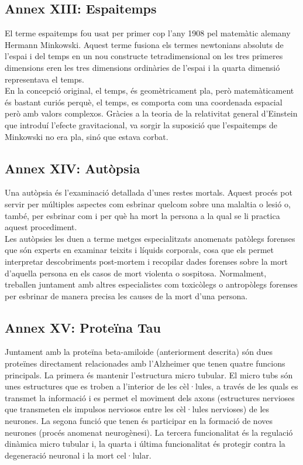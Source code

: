 \documentclass[a4paper,12pt]{article}
\begin{document}
\subsection*{Annex XIII: Espaitemps}
El terme espaitemps fou usat per primer cop l'any 1908 pel matemàtic alemany Hermann Minkowski. Aquest terme fusiona els termes newtonians absoluts de l'espai i del temps en un nou constructe tetradimensional on les tres primeres dimensions eren les tres dimensions ordinàries de l'espai i la quarta dimensió representava el temps.\\
En la concepció original, el temps, és geomètricament pla, però matemàticament és bastant curiós perquè, el temps, es comporta com una coordenada espacial però amb valors complexos. Gràcies a la teoria de la relativitat general d'Einstein que introduí l'efecte gravitacional, va sorgir la suposició que l'espaitemps de Minkowski no era pla, sinó que estava corbat.
\subsection*{Annex XIV: Autòpsia}
Una autòpsia és l'examinació detallada d'unes restes mortals. Aquest procés pot servir per múltiples aspectes com esbrinar quelcom sobre una malaltia o lesió o, també, per esbrinar com i per què ha mort la persona a la qual se li practica aquest procediment.\\
Les autòpsies les duen a terme metges especialitzats anomenats patòlegs forenses que són experts en examinar teixits i líquids corporals, cosa que els permet interpretar descobriments post-mortem i recopilar dades forenses sobre la mort d'aquella persona en els casos de mort violenta o sospitosa. Normalment, treballen juntament amb altres especialistes com toxicòlegs o antropòlegs forenses per esbrinar de manera precisa les causes de la mort d'una persona.
\subsection*{Annex XV: Proteïna Tau}
Juntament amb la proteïna beta-amiloide (anteriorment descrita) són dues proteïnes directament relacionades amb l'Alzheimer que tenen quatre funcions principals. La primera és mantenir l'estructura micro tubular. El micro tubs són unes estructures que es troben a l'interior de les cèl·lules, a través de les quals es transmet la informació i es permet el moviment dels axons (estructures nervioses que transmeten els impulsos nerviosos entre les cèl·lules nervioses) de les neurones. La segona funció que tenen és participar en la formació de noves neurones (procés anomenat neurogènesi). La tercera funcionalitat és la regulació dinàmica micro tubular i, la quarta i última funcionalitat és protegir contra la degeneració neuronal i la mort cel·lular.
\end{document}
